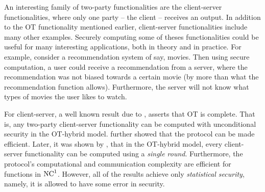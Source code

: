 \documentclass{llncs}
\begin{document}
An interesting family of two-party functionalities are the client-server functionalities, where only one party -- the client -- receives an output.
In addition to the OT functionality mentioned earlier, client-server functionalities include many other examples. Securely computing some of theses functionalities could be useful for many interesting applications, both in theory and in practice. For example, consider a recommendation system of say, movies. Then using secure computation, a user could receive a recommendation from a server, where the recommendation was not biased towards a certain movie (by more than what the recommendation function allows). Furthermore, the server will not know what types of movies the user likes to watch.

For client-server, a well known result due to \citet{Kilian88}, asserts that OT is complete. That is, any two-party client-server functionality can be computed with unconditional security in the OT-hybrid model. \citet*{IPS08} further showed that the protocol can be made efficient. Later, it was shown by \citet{IKOPS11}, that in the OT-hybrid model, every client-server functionality can be computed using a \emph{single round}. Furthermore, the protocol's computational and communication complexity are efficient for functions in $\mathrm{NC}^1$. However, all of the results achieve only \emph{statistical security}, namely, it is allowed to have some error in security. 
\end{document}
